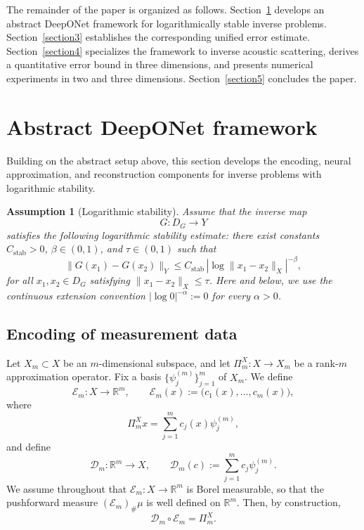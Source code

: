 \documentclass{article}
\numberwithin{equation}{section}
\theoremstyle{plain}
\newtheorem{assumption}{Assumption}[section]
\newcommand{\RR}{\mathbb{R}}
\begin{document}
	The remainder of the paper is organized as follows. Section~\ref{section2} develops an abstract DeepONet framework for logarithmically stable inverse problems. Section~\ref{section3} establishes the corresponding unified error estimate. Section~\ref{section4} specializes the framework to inverse acoustic scattering, derives a quantitative error bound in three dimensions, and presents numerical experiments in two and three dimensions. Section~\ref{section5} concludes the paper.
	
	\section{Abstract DeepONet framework}\label{section2}
	Building on the abstract setup above, this section develops the encoding, neural approximation, and reconstruction components for inverse problems with logarithmic stability.
	
	\begin{assumption}[Logarithmic stability]\label{ass:stability}
		Assume that the inverse map
		\[
		G:D_G\to Y
		\]
		satisfies the following logarithmic stability estimate: there exist constants
		$C_{\mathrm{stab}}>0$, $\beta\in(0,1)$, and $\tau\in(0,1)$ such that
		\[
		\|G(x_1)-G(x_2)\|_Y
		\le
		C_{\mathrm{stab}}\,|\log \|x_1-x_2\|_X|^{-\beta},
		\]
		for all $x_1,x_2\in D_G$ satisfying $\|x_1-x_2\|_X\le \tau$. Here and below, we use the continuous extension convention $|\log 0|^{-\alpha}:=0$ for every $\alpha>0$.
	\end{assumption}
	
	\subsection{Encoding of measurement data}
	
	Let $X_m\subset X$ be an $m$-dimensional subspace, and let $\Pi_m^X:X\to X_m$ be a rank-$m$ approximation operator. Fix a basis $\{\psi_j^{(m)}\}_{j=1}^m$ of $X_m$. We define
	\begin{equation*}
		\mathcal E_m:X\to\RR^m,
		\qquad
		\mathcal E_m(x):=\bigl(c_1(x),\dots,c_m(x)\bigr),
	\end{equation*}
	where
	\begin{equation*}
		\Pi_m^X x=\sum_{j=1}^m c_j(x)\psi_j^{(m)},
	\end{equation*}
	and define
	\begin{equation*}
		\mathcal D_m:\RR^m\to X,
		\qquad
		\mathcal D_m(c):=\sum_{j=1}^m c_j\psi_j^{(m)}.
	\end{equation*}
	We assume throughout that $\mathcal E_m:X\to\RR^m$ is Borel measurable, so that the pushforward measure $(\mathcal E_m)_\#\mu$ is well defined on $\RR^m$.
	Then, by construction,
	\begin{equation*}
		\mathcal D_m\circ \mathcal E_m=\Pi_m^X.
	\end{equation*}
	
\end{document}

